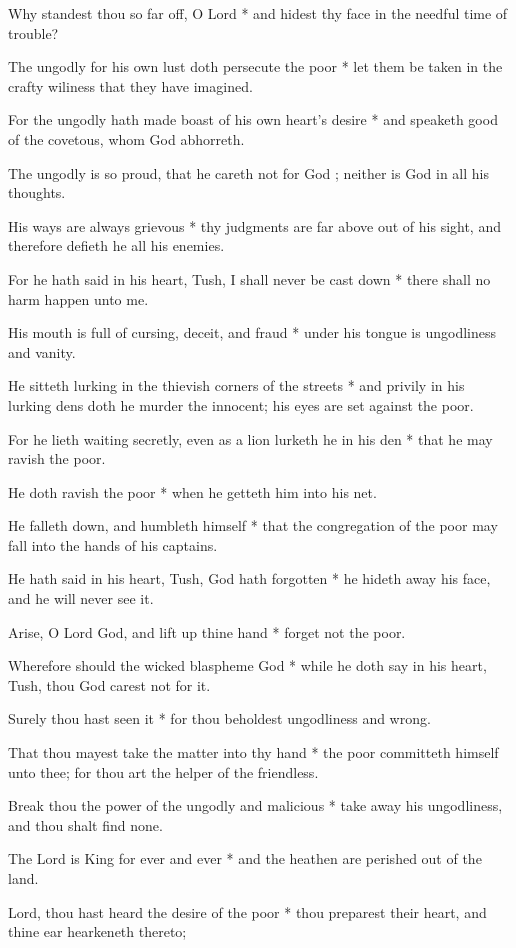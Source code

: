 Why standest thou so far off, O Lord * and hidest thy face in the needful time of trouble?

The ungodly for his own lust doth persecute the poor * let them be taken in the crafty wiliness that they have imagined.

For the ungodly hath made boast of his own heart's desire * and speaketh good of the covetous, whom God abhorreth.

The ungodly is so proud, that he careth not for God ; neither is God in all his thoughts.

His ways are always grievous * thy judgments are far above out of his sight, and therefore defieth he all his enemies.

For he hath said in his heart, Tush, I shall never be cast down * there shall no harm happen unto me.

His mouth is full of cursing, deceit, and fraud * under his tongue is ungodliness and vanity.

He sitteth lurking in the thievish corners of the streets * and privily in his lurking dens doth he murder the innocent; his eyes are set against the poor.

For he lieth waiting secretly, even as a lion lurketh he in his den * that he may ravish the poor.

He doth ravish the poor * when he getteth him into his net.

He falleth down, and humbleth himself * that the congregation of the poor may fall into the hands of his captains.

He hath said in his heart, Tush, God hath forgotten * he hideth away his face, and he will never see it.

Arise, O Lord God, and lift up thine hand * forget not the poor.

Wherefore should the wicked blaspheme God * while he doth say in his heart, Tush, thou God carest not for it.

Surely thou hast seen it * for thou beholdest ungodliness and wrong.

That thou mayest take the matter into thy hand * the poor committeth himself unto thee; for thou art the helper of the friendless.

Break thou the power of the ungodly and malicious * take away his ungodliness, and thou shalt find none.

The Lord is King for ever and ever * and the heathen are perished out of the land.

Lord, thou hast heard the desire of the poor * thou preparest their heart, and thine ear hearkeneth thereto;

